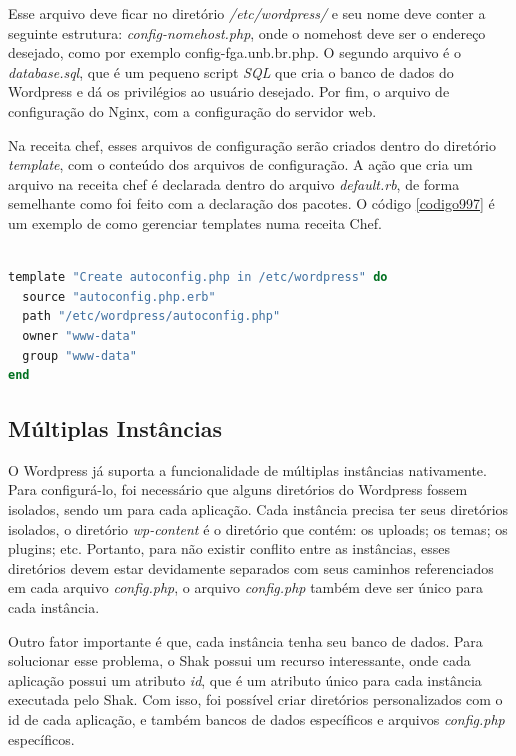 Esse arquivo deve ficar no diretório \textit{/etc/wordpress/} e seu nome deve conter
a seguinte estrutura: \textit{config-nomehost.php}, onde o nomehost deve ser o endereço
desejado, como por exemplo config-fga.unb.br.php. O segundo arquivo é o \textit{database.sql}, que é um pequeno script \textit{SQL} que
cria o banco de dados do Wordpress e dá os privilégios ao usuário desejado. Por fim,
o arquivo de configuração do Nginx, com a configuração do servidor web.

Na receita chef, esses arquivos de configuração serão criados dentro do diretório 
\textit{template}, com o conteúdo dos arquivos de configuração. A ação que cria 
um arquivo na receita chef é 
declarada dentro do arquivo \textit{default.rb}, de forma semelhante como foi feito com
a declaração dos pacotes. O código \ref{codigo997} é um exemplo de como 
gerenciar templates numa receita Chef.

\begin{lstlisting}[language=Ruby,label=dice_index,caption={Exemplo de criação de templates com o chef}, label=codigo997]

template "Create autoconfig.php in /etc/wordpress" do
  source "autoconfig.php.erb"
  path "/etc/wordpress/autoconfig.php"
  owner "www-data"
  group "www-data"
end
\end{lstlisting}

\subsection{Múltiplas Instâncias}

O Wordpress já suporta a funcionalidade de múltiplas instâncias nativamente. 
Para configurá-lo, foi necessário que alguns diretórios do Wordpress
fossem isolados, sendo um para cada aplicação. Cada instância precisa
ter seus diretórios isolados, o diretório \textit{wp-content} é o diretório 
que contém: os uploads; os temas; os plugins; etc. Portanto, para não
existir conflito entre as instâncias, esses diretórios devem estar devidamente separados
com seus caminhos referenciados em cada arquivo \textit{config.php}, o arquivo 
\textit{config.php} também
deve ser único para cada instância. 

Outro fator importante é que, cada instância
tenha seu banco de dados. Para
solucionar esse problema, o Shak possui um recurso interessante, onde cada aplicação
possui um atributo \textit{id}, que é um atributo único para cada instância executada pelo
Shak. Com isso, foi possível criar diretórios personalizados com o id de cada aplicação, 
e também bancos de dados específicos e arquivos \textit{config.php} específicos.

